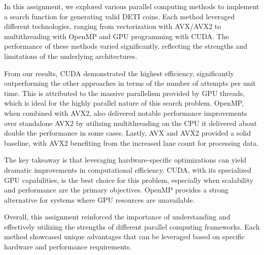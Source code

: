 \documentclass[a4paper,12pt]{article}
\begin{document}
In this assignment, we explored various parallel computing methods to implement a search function for generating valid DETI coins. Each method leveraged different technologies, ranging from vectorization with AVX/AVX2 to multithreading with OpenMP and GPU programming with CUDA. The performance of these methods varied significantly, reflecting the strengths and limitations of the underlying architectures.

From our results, CUDA demonstrated the highest efficiency, significantly outperforming the other approaches in terms of the number of attempts per unit time. This is attributed to the massive parallelism provided by GPU threads, which is ideal for the highly parallel nature of this search problem. OpenMP, when combined with AVX2, also delivered notable performance improvements over standalone AVX2 by utilizing multithreading on the CPU it delivered about double the performance in some cases. Lastly, AVX and AVX2 provided a solid baseline, with AVX2 benefiting from the increased lane count for processing data.

The key takeaway is that leveraging hardware-specific optimizations can yield dramatic improvements in computational efficiency. CUDA, with its specialized GPU capabilities, is the best choice for this problem, especially when scalability and performance are the primary objectives. OpenMP provides a strong alternative for systems where GPU resources are unavailable.

Overall, this assignment reinforced the importance of understanding and effectively utilizing the strengths of different parallel computing frameworks. Each method showcased unique advantages that can be leveraged based on specific hardware and performance requirements.
\end{document}
